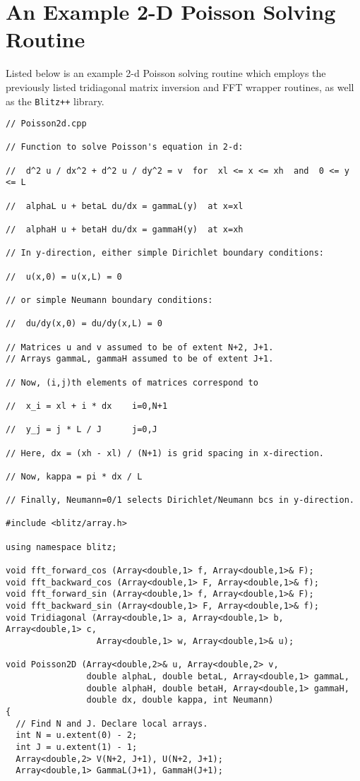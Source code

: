 \section{An Example 2-D Poisson Solving Routine}\label{poisson2d}
Listed below is an example 2-d Poisson solving routine which employs the previously
listed tridiagonal matrix inversion  and FFT wrapper routines, as well as the {\tt Blitz++}
library.
{\small\begin{verbatim}
// Poisson2d.cpp

// Function to solve Poisson's equation in 2-d:

//  d^2 u / dx^2 + d^2 u / dy^2 = v  for  xl <= x <= xh  and  0 <= y <= L

//  alphaL u + betaL du/dx = gammaL(y)  at x=xl

//  alphaH u + betaH du/dx = gammaH(y)  at x=xh

// In y-direction, either simple Dirichlet boundary conditions:

//  u(x,0) = u(x,L) = 0

// or simple Neumann boundary conditions:

//  du/dy(x,0) = du/dy(x,L) = 0

// Matrices u and v assumed to be of extent N+2, J+1.
// Arrays gammaL, gammaH assumed to be of extent J+1.

// Now, (i,j)th elements of matrices correspond to

//  x_i = xl + i * dx    i=0,N+1

//  y_j = j * L / J      j=0,J

// Here, dx = (xh - xl) / (N+1) is grid spacing in x-direction.

// Now, kappa = pi * dx / L

// Finally, Neumann=0/1 selects Dirichlet/Neumann bcs in y-direction.

#include <blitz/array.h>

using namespace blitz;

void fft_forward_cos (Array<double,1> f, Array<double,1>& F);
void fft_backward_cos (Array<double,1> F, Array<double,1>& f);
void fft_forward_sin (Array<double,1> f, Array<double,1>& F);
void fft_backward_sin (Array<double,1> F, Array<double,1>& f);
void Tridiagonal (Array<double,1> a, Array<double,1> b, Array<double,1> c, 
                  Array<double,1> w, Array<double,1>& u);

void Poisson2D (Array<double,2>& u, Array<double,2> v, 
                double alphaL, double betaL, Array<double,1> gammaL, 
                double alphaH, double betaH, Array<double,1> gammaH,
                double dx, double kappa, int Neumann)
{
  // Find N and J. Declare local arrays.
  int N = u.extent(0) - 2;
  int J = u.extent(1) - 1;
  Array<double,2> V(N+2, J+1), U(N+2, J+1);
  Array<double,1> GammaL(J+1), GammaH(J+1);


\end{verbatim}}
